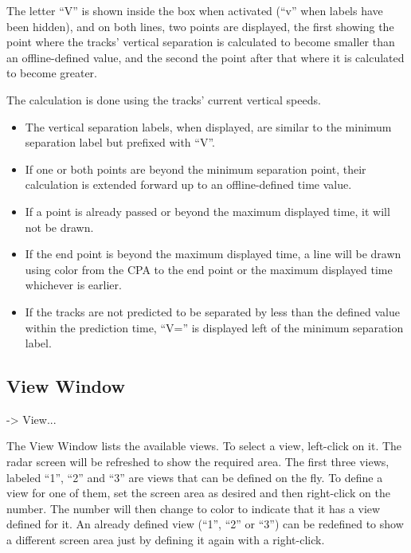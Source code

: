 \documentclass[a4paper,oneside,11pt]{memoir}
\begin{document}
\bigskip

The letter “V” is shown inside the box when activated (“v” when labels have been hidden), and on both lines, two points are displayed, the first showing the point where the tracks’ vertical separation is calculated to become smaller than an offline-defined value, and the second the point after that where it is calculated to become greater. 

\bigskip

The calculation is done using the tracks’ current vertical speeds.

\begin{itemize}
    \item The vertical separation labels, when displayed, are similar to the minimum separation label but prefixed with “V”.
    \item If one or both points are beyond the minimum separation point, their calculation is extended forward up to an offline-defined time value.
    \item If a point is already passed or beyond the maximum displayed time, it will not be drawn.
    \item If the end point is beyond the maximum displayed time, a line will be drawn using  color from the CPA to the end point or the maximum displayed time whichever is earlier.
    \item If the tracks are not predicted to be separated by less than the defined value within the prediction time, “V=” is displayed left of the minimum separation label.
\end{itemize}

\subsection{View Window}
\label{win:view}
 -> View...

\bigskip


The View Window lists the available views. To select a view, left-click on it. The radar screen will be refreshed to show the required area. The first three views, labeled “1”, “2” and “3” are views that can be defined on the fly. To define a view for one of them, set the screen area as desired and then right-click on the number. The number will then change to  color to indicate that it has a view defined for it. An already defined view (“1”, “2” or “3”) can be redefined to show a different screen area just by defining it again with a right-click.
\end{document}
